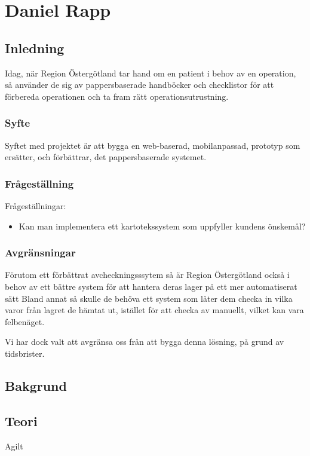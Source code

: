 \section{Daniel Rapp}
\subsection{Inledning}
Idag, när Region Östergötland tar hand om en patient i behov av en operation, så använder de sig av pappersbaserade handböcker och checklistor för att
förbereda operationen och ta fram rätt operationsutrustning.

\subsubsection{Syfte}
Syftet med projektet är att bygga en web-baserad, mobilanpassad, prototyp som ersätter, och förbättrar, det pappersbaserade systemet.


\subsubsection{Frågeställning}
Frågeställningar:
\begin{itemize}
  \item Kan man implementera ett kartotekssystem som uppfyller kundens önskemål?
\end{itemize}


\subsubsection{Avgränsningar}
Förutom ett förbättrat avcheckningsssytem så är Region Östergötland också i behov av
ett bättre system för att hantera deras lager på ett mer automatiserat sätt%
Bland annat
så skulle de behöva ett system som låter dem checka in vilka varor från lagret de hämtat
ut, istället för att checka av manuellt, vilket kan vara felbenäget.

Vi har dock valt att avgränsa oss från att bygga denna lösning, på grund av tidsbrister.


\subsection{Bakgrund}


\subsection{Teori}
Agilt

